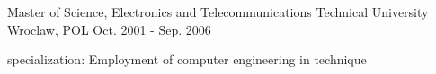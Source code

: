 

\begin{cventries}

  \cventry
    {Master of Science, Electronics and Telecommunications} %
    {Technical University} %
    {Wroclaw, POL} %
    {Oct. 2001 - Sep. 2006} %
    {
      \begin{cvitems} %
        \item {specialization: Employment of computer engineering in technique}
      \end{cvitems}
    }

\end{cventries}
